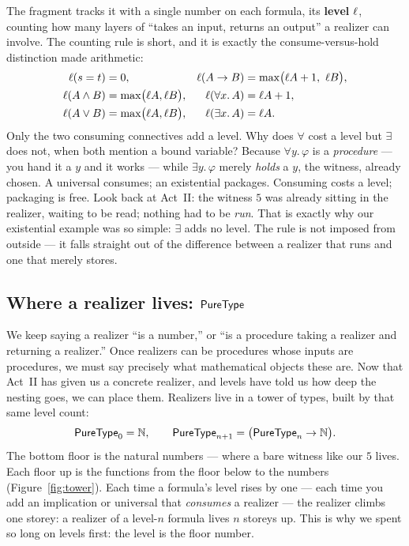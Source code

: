 \documentclass[11pt]{article}
\begin{document}
The fragment tracks it with a single number on each formula, its
\textbf{level} $\ell$, counting how many layers of ``takes an input, returns
an output'' a realizer can involve. The counting rule is short, and it is
exactly the consume-versus-hold distinction made arithmetic:
\begin{align*}
  \ell(s=t)              &= 0, &
  \ell(A \rightarrow B)  &= \max\bigl(\ell A + 1,\ \ell B\bigr), \\
  \ell(A \land B)        &= \max\bigl(\ell A,\ell B\bigr), &
  \ell(\forall x.\,A)    &= \ell A + 1, \\
  \ell(A \lor B)         &= \max\bigl(\ell A,\ell B\bigr), &
  \ell(\exists x.\,A)    &= \ell A.
\end{align*}
Only the two consuming connectives add a level. Why does $\forall$ cost a
level but $\exists$ does not, when both mention a bound variable? Because
$\forall y.\,\varphi$ is a \emph{procedure} --- you hand it a $y$ and it works
--- while $\exists y.\,\varphi$ merely \emph{holds} a $y$, the witness,
already chosen. A universal consumes; an existential packages. Consuming
costs a level; packaging is free. Look back at Act~II: the witness $5$ was
already sitting in the realizer, waiting to be read; nothing had to be
\emph{run}. That is exactly why our existential example was so simple:
$\exists$ adds no level. The rule is not imposed from outside --- it falls
straight out of the difference between a realizer that runs and one that
merely stores.

\subsection*{Where a realizer lives: \texorpdfstring{$\mathsf{PureType}$}{PureType}}

We keep saying a realizer ``is a number,'' or ``is a procedure taking a
realizer and returning a realizer.'' Once realizers can be procedures whose
inputs are procedures, we must say precisely what mathematical objects these
are. Now that Act~II has given us a concrete realizer, and levels have told
us how deep the nesting goes, we can place them. Realizers live in a tower of
types, built by that same level count:
\[
  \mathsf{PureType}_0 = \mathbb{N}, \qquad
  \mathsf{PureType}_{n+1} = \bigl(\mathsf{PureType}_n \to \mathbb{N}\bigr).
\]
The bottom floor is the natural numbers --- where a bare witness like our $5$
lives. Each floor up is the functions from the floor below to the numbers
(Figure~\ref{fig:tower}). Each time a formula's level rises by one --- each
time you add an implication or universal that \emph{consumes} a realizer ---
the realizer climbs one storey: a realizer of a level-$n$ formula lives $n$
storeys up. This is why we spent so long on levels first: the level is the
floor number.
\end{document}
